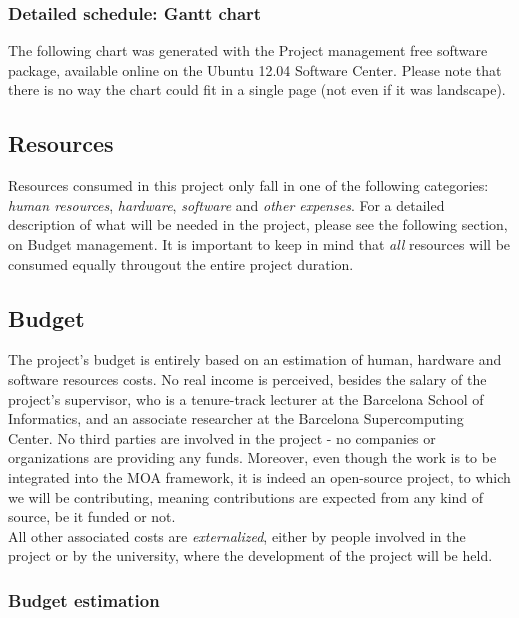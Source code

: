 \subsubsection{Detailed schedule: Gantt chart}

The following chart was generated with the Project management free software package, available online on the Ubuntu 12.04 Software Center. Please note that there is no way the chart could fit in a single page (not even if it was landscape).



\subsection{Resources}

Resources consumed in this project only fall in one of the following categories: \textit{human resources}, \textit{hardware}, \textit{software} and \textit{other expenses}. For a detailed description of what will be needed in the project, please see the following section, on Budget management. It is important to keep in mind that \textit{all} resources will be consumed equally througout the entire project duration.

\subsection{Budget}

The project’s budget is entirely based on an estimation of human, hardware and software resources costs. No real income is perceived, besides the salary of the project’s supervisor, who is a tenure-track lecturer at the Barcelona School of Informatics, and an associate researcher at the Barcelona Supercomputing Center. No third parties are involved in the project - no companies or organizations are providing any funds. Moreover, even though the work is to be integrated into the MOA framework, it is indeed an open-source project, to which we will be contributing, meaning contributions are expected from any kind of source, be it funded or not.\\

All other associated costs are \textit{externalized}, either by people involved in the project or by the university, where the development of the project will be held.

\subsubsection{Budget estimation}

